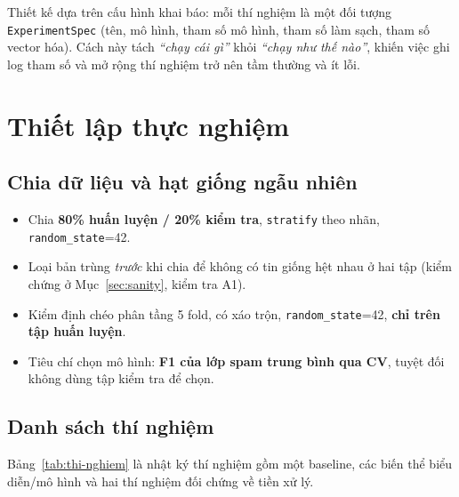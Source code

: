 Thiết kế dựa trên cấu hình khai báo: mỗi thí nghiệm là một đối tượng \texttt{ExperimentSpec} (tên, mô hình, tham số mô hình, tham số làm sạch, tham số vector hóa). Cách này tách \textit{``chạy cái gì''} khỏi \textit{``chạy như thế nào''}, khiến việc ghi log tham số và mở rộng thí nghiệm trở nên tầm thường và ít lỗi.

\section{Thiết lập thực nghiệm}

\subsection{Chia dữ liệu và hạt giống ngẫu nhiên}

\begin{itemize}
    \item Chia \textbf{80\% huấn luyện / 20\% kiểm tra}, \texttt{stratify} theo nhãn, \texttt{random\_state}=42.
    \item Loại bản trùng \textit{trước} khi chia để không có tin giống hệt nhau ở hai tập (kiểm chứng ở Mục~\ref{sec:sanity}, kiểm tra A1).
    \item Kiểm định chéo phân tầng 5 fold, có xáo trộn, \texttt{random\_state}=42, \textbf{chỉ trên tập huấn luyện}.
    \item Tiêu chí chọn mô hình: \textbf{F1 của lớp spam trung bình qua CV}, tuyệt đối không dùng tập kiểm tra để chọn.
\end{itemize}

\subsection{Danh sách thí nghiệm}

Bảng~\ref{tab:thi-nghiem} là nhật ký thí nghiệm gồm một baseline, các biến thể biểu diễn/mô hình và hai thí nghiệm đối chứng về tiền xử lý.

